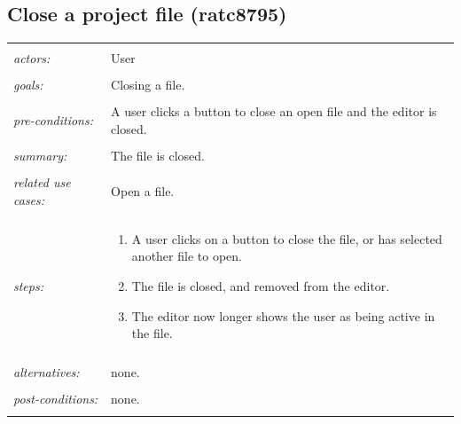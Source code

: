\documentclass[11pt]{report}
\begin{document}
\subsection{Close a project file (ratc8795)}
\begin{tabular}{ p{2cm} p{12cm} }
 \hline
 \\
 \textit{actors:} & User \\ 
 \\
 \textit{goals:} & Closing a file. \\
 \\
 \textit{pre-conditions:} & A user clicks a button to close an open file and the editor is closed. \\
 \\
 \textit{summary:} & The file is closed. \\ 
 \\
 \textit{related use cases:} & Open a file. \\ 
 \\
 \textit{steps:} & \begin{enumerate}
  \item A user clicks on a button to close the file, or has selected another file to open.
  \item The file is closed, and removed from the editor.
  \item The editor now longer shows the user as being active in the file.
 \end{enumerate} \\
 \\
 \textit{alternatives:} & none. \\
 \\
 \textit{post-conditions:} & none. \\
 \\
\hline
\end{tabular}
\end{document}
